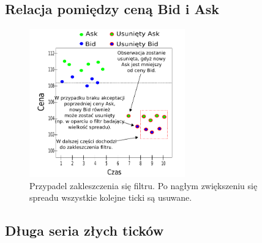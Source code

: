 \documentclass[a4paper,12pt,openany, DIV=calc]{scrbook}
\begin{document}
\subsection{Relacja pomiędzy ceną Bid i Ask}

\begin{figure}[H]
  \centering
  \includegraphics[width=0.6\textwidth]{wykresy/relacjaBIDASK.pdf}
  \caption{Przypadel zakleszczenia się filtru. Po nagłym zwiększeniu się spreadu wszystkie kolejne ticki są usuwane.}
  \label{fig:BIDASK}

\end{figure}

\subsection{Długa seria złych ticków}




\listoftables
{}
\listoffigures
{}
\printindex
\end{document}
